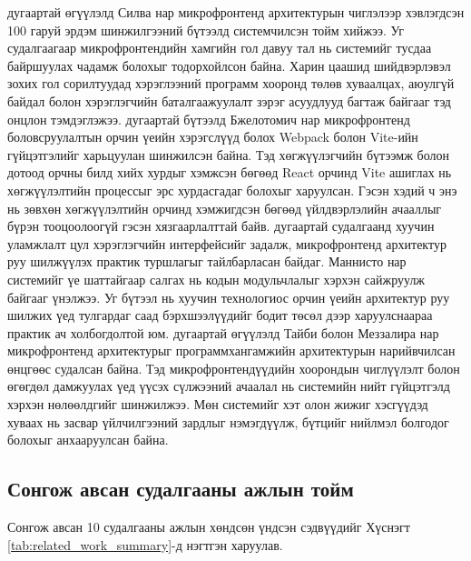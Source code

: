 \newline
\hspace*{0.6cm}\cite{silva2024} дугаартай өгүүлэлд Силва нар микрофронтенд архитектурын чиглэлээр хэвлэгдсэн 100 гаруй эрдэм шинжилгээний бүтээлд системчилсэн тойм хийжээ. Уг судалгаагаар микрофронтендийн хамгийн гол давуу тал нь системийг тусдаа байршуулах чадамж болохыг тодорхойлсон байна. Харин цаашид шийдвэрлэвэл зохих гол сорилтуудад хэрэглээний программ хооронд төлөв хуваалцах, аюулгүй байдал болон хэрэглэгчийн баталгаажуулалт зэрэг асуудлууд багтаж байгааг тэд онцлон тэмдэглэжээ.
\newline
\hspace*{0.6cm}\cite{bjelotomic2024} дугаартай бүтээлд Бжелотомич нар микрофронтенд боловсруулалтын орчин үеийн хэрэгслүүд болох Webpack болон Vite-ийн гүйцэтгэлийг харьцуулан шинжилсэн байна. Тэд хөгжүүлэгчийн бүтээмж болон дотоод орчны билд хийх хурдыг хэмжсэн бөгөөд React орчинд Vite ашиглах нь хөгжүүлэлтийн процессыг эрс хурдасгадаг болохыг харуулсан. Гэсэн хэдий ч энэ нь зөвхөн хөгжүүлэлтийн орчинд хэмжигдсэн бөгөөд үйлдвэрлэлийн ачааллыг бүрэн тооцоолоогүй гэсэн хязгаарлалттай байв.
\newline
\hspace*{0.6cm}\cite{mannisto2023} дугаартай судалгаанд хуучин уламжлалт цул хэрэглэгчийн интерфейсийг задалж, микрофронтенд архитектур руу шилжүүлэх практик туршлагыг тайлбарласан байдаг. Маннисто нар системийг үе шаттайгаар салгах нь кодын модульчлалыг хэрхэн сайжруулж байгааг үнэлжээ. Уг бүтээл нь хуучин технологиос орчин үеийн архитектур руу шилжих үед тулгардаг саад бэрхшээлүүдийг бодит төсөл дээр харуулснаараа практик ач холбогдолтой юм.
\newline
\hspace*{0.6cm}\cite{taibi2022} дугаартай өгүүлэлд Тайби болон Меззалира нар микрофронтенд архитектурыг программхангамжийн архитектурын нарийвчилсан өнцгөөс судалсан байна. Тэд микрофронтендүүдийн хоорондын чиглүүлэлт болон өгөгдөл дамжуулах үед үүсэх сүлжээний ачаалал нь системийн нийт гүйцэтгэлд хэрхэн нөлөөлдгийг шинжилжээ. Мөн системийг хэт олон жижиг хэсгүүдэд хуваах нь засвар үйлчилгээний зардлыг нэмэгдүүлж, бүтцийг нийлмэл болгодог болохыг анхааруулсан байна.

\subsection{Сонгож авсан судалгааны ажлын тойм}
Сонгож авсан 10 судалгааны ажлын хөндсөн үндсэн сэдвүүдийг Хүснэгт \ref{tab:related_work_summary}-д нэгтгэн харуулав.

